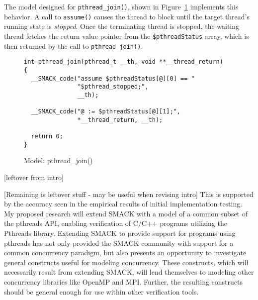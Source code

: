 The model designed for \lstinline|pthread_join()|, shown in
Figure~\ref{fig:pthread_join} implements this behavior.  A call to
\lstinline|assume()| causes the thread to block until the target
thread's running state is \emph{stopped}.  Once the terminating thread
is stopped, the waiting thread fetches the return value pointer from
the \lstinline|$pthreadStatus| array, which is then returned by the
call to \lstinline|pthread_join()|.

\begin{figure}[h]
\centering
\caption{Model: pthread\_join()}\label{fig:pthread_join}
\begin{lstlisting}
int pthread_join(pthread_t __th, void **__thread_return)
{
  __SMACK_code("assume $pthreadStatus[@][0] == "
               "$pthread_stopped;",
               __th);

  __SMACK_code("@ := $pthreadStatus[@][1];",
               *__thread_return, __th);

  return 0;
}

\end{lstlisting}
\end{figure}


[leftover from intro]


[Remaining is leftover stuff - may be useful when revising intro]
This is supported by the accuracy seen in the empirical results of
initial implementation testing.  My proposed research will extend
SMACK with a model of a common subset of the pthreads API, enabling
verification of C/C++ programs utilizing the Pthreads library.
Extending SMACK to provide support for programs using pthreads has not
only provided the SMACK community with support for a common
concurrency paradigm, but also presents an opportunity to investigate
general constructs useful for modeling concurrency.  These constructs,
which will necessarily result from extending SMACK, will lend
themselves to modeling other concurrency libraries like OpenMP and
MPI.  Further, the resulting constructs should be general enough for
use within other verification tools. 

